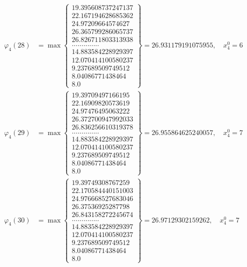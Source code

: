 \documentclass{article}
\begin{document}
\begin{align*}
  
  
  
\varphi_{4}(28) &= \max \left\{ \begin{array}{c}
19.395608737247137 \\
 22.167194628685362 \\
 24.97209664574627 \\
 26.365799286065737 \\
 26.826711803313938 \\
 .............. \\
 14.883584228929397 \\
 12.070414100580237 \\
 9.237689509749512 \\
 8.04086771438464 \\
 8.0
\end{array} \right\} = 26.931179191075955, \quad x_{4}^0 = 6\\
  
  
  
  
\varphi_{4}(29) &= \max \left\{ \begin{array}{c}
19.39709497166195 \\
 22.16909820573619 \\
 24.97476495063222 \\
 26.372700947992033 \\
 26.836256610319378 \\
 .............. \\
 14.883584228929397 \\
 12.070414100580237 \\
 9.237689509749512 \\
 8.04086771438464 \\
 8.0
\end{array} \right\} = 26.955864625240057, \quad x_{4}^0 = 7\\
  
  
  
  
\varphi_{4}(30) &= \max \left\{ \begin{array}{c}
19.39749308767259 \\
 22.170584440151003 \\
 24.976668527683046 \\
 26.37536925287798 \\
 26.843158272245674 \\
 .............. \\
 14.883584228929397 \\
 12.070414100580237 \\
 9.237689509749512 \\
 8.04086771438464 \\
 8.0
\end{array} \right\} = 26.97129302159262, \quad x_{4}^0 = 7\\
  

\end{align*}
\end{document}
